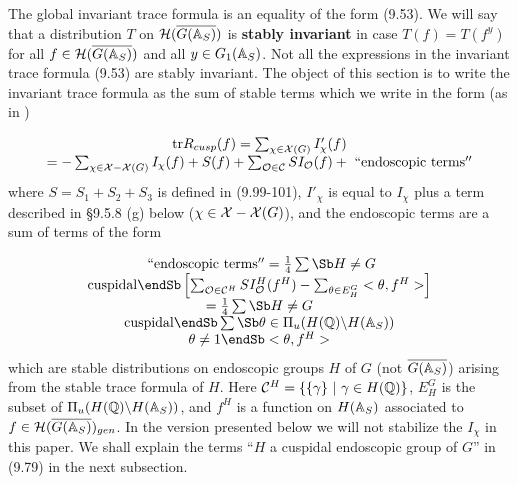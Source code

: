 The global invariant trace formula is an equality of the form (9.53).
We will say that a distribution $T$ on
${\cal{H}}(\overline{G({\Bbb{A}}_S)})$ is 
\textbf{stably invariant} in case $T(f)=T(f^y)$ for all
$f\in {\cal{H}}(\overline{G({\Bbb{A}}_S)})$ and all
$y\in G_1({\Bbb{A}}_S)$. Not all the expressions
in the invariant trace formula (9.53) are stably invariant.
The object
of this section is to write the invariant trace formula
as the sum of stable
terms which we write in the form (as in \cite{L3})

\begin{equation}
\begin{array}{c}
{\rm tr}R_{cusp}(f)=
\sum_{\chi \in {\cal{X}}(G)}I'_\chi (f)\\
=-\sum_{\chi \in {\cal{X}}-{\cal{X}}(G)}I_\chi (f)
+S(f)
+\sum_{\mathcal{O}\in \mathcal{C}}SI_{\mathcal{O}}(f)
+{\rm\ ``endoscopic\ terms''}
\end{array}
\end{equation}
where $S=S_1+S_2+S_3$ is defined in (9.99-101),
$I'_\chi$ is equal to $I_\chi$ plus a term described in
\S 9.5.8 (g) below ($\chi\in
{\cal{X}}-{\cal{X}}(G)$), and
the endoscopic terms are a sum of terms of the form

\begin{equation}
\begin{array}{c}
{\rm\ ``endoscopic\ terms''}
=
{1\over 4}
\sum\Sb H\not= G\\ {\rm cuspidal}\endSb
\left[
\sum_{{\mathcal{O}}\in {\mathcal{C}}^H}SI^H_{\mathcal{O}}(f^H)
-\sum_{\theta\in E_H^G}<\theta,f^H>
\right]\\
={1\over 4}
\sum\Sb H\not= G\\ {\rm cuspidal}\endSb
\sum\Sb
\theta\in \Pi_u(H({\Bbb{Q}})\backslash H({\Bbb{A}}_S))\\
\theta\not= 1
\endSb
<\theta,f^H>
\end{array}
\end{equation}
which are stable distributions on endoscopic groups $H$ of $G$
(not $\overline{G({\Bbb{A}}_S)}$)
arising from the stable trace formula of $H$.
Here ${\cal{C}}^H=\{\{\gamma\}\ |\ \gamma\in H({\Bbb{Q}})\}$,
$E_H^G$ is the subset of
$\Pi_u(H({\Bbb{Q}})\backslash {H({\Bbb{A}}_S)})$,
and $f^H$ is a function on
$H({\Bbb{A}}_S)$ associated to
$f\in {\cal{H}}(\overline{G({\Bbb{A}}_S)})_{gen}$.
In the version presented below we will not
stabilize the $I_\chi$ in this paper.
We shall explain the terms ``$H$ a cuspidal endoscopic group of
$G$'' in (9.79) in the next subsection.

